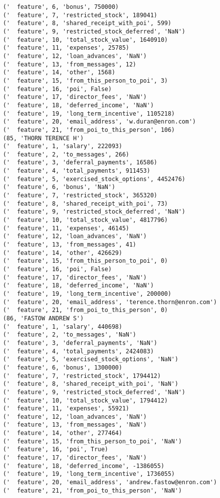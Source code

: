 \begin{verbatim}
('  feature', 6, 'bonus', 750000)
('  feature', 7, 'restricted_stock', 189041)
('  feature', 8, 'shared_receipt_with_poi', 599)
('  feature', 9, 'restricted_stock_deferred', 'NaN')
('  feature', 10, 'total_stock_value', 1640910)
('  feature', 11, 'expenses', 25785)
('  feature', 12, 'loan_advances', 'NaN')
('  feature', 13, 'from_messages', 12)
('  feature', 14, 'other', 1568)
('  feature', 15, 'from_this_person_to_poi', 3)
('  feature', 16, 'poi', False)
('  feature', 17, 'director_fees', 'NaN')
('  feature', 18, 'deferred_income', 'NaN')
('  feature', 19, 'long_term_incentive', 1105218)
('  feature', 20, 'email_address', 'w.duran@enron.com')
('  feature', 21, 'from_poi_to_this_person', 106)
(85, 'THORN TERENCE H')
('  feature', 1, 'salary', 222093)
('  feature', 2, 'to_messages', 266)
('  feature', 3, 'deferral_payments', 16586)
('  feature', 4, 'total_payments', 911453)
('  feature', 5, 'exercised_stock_options', 4452476)
('  feature', 6, 'bonus', 'NaN')
('  feature', 7, 'restricted_stock', 365320)
('  feature', 8, 'shared_receipt_with_poi', 73)
('  feature', 9, 'restricted_stock_deferred', 'NaN')
('  feature', 10, 'total_stock_value', 4817796)
('  feature', 11, 'expenses', 46145)
('  feature', 12, 'loan_advances', 'NaN')
('  feature', 13, 'from_messages', 41)
('  feature', 14, 'other', 426629)
('  feature', 15, 'from_this_person_to_poi', 0)
('  feature', 16, 'poi', False)
('  feature', 17, 'director_fees', 'NaN')
('  feature', 18, 'deferred_income', 'NaN')
('  feature', 19, 'long_term_incentive', 200000)
('  feature', 20, 'email_address', 'terence.thorn@enron.com')
('  feature', 21, 'from_poi_to_this_person', 0)
(86, 'FASTOW ANDREW S')
('  feature', 1, 'salary', 440698)
('  feature', 2, 'to_messages', 'NaN')
('  feature', 3, 'deferral_payments', 'NaN')
('  feature', 4, 'total_payments', 2424083)
('  feature', 5, 'exercised_stock_options', 'NaN')
('  feature', 6, 'bonus', 1300000)
('  feature', 7, 'restricted_stock', 1794412)
('  feature', 8, 'shared_receipt_with_poi', 'NaN')
('  feature', 9, 'restricted_stock_deferred', 'NaN')
('  feature', 10, 'total_stock_value', 1794412)
('  feature', 11, 'expenses', 55921)
('  feature', 12, 'loan_advances', 'NaN')
('  feature', 13, 'from_messages', 'NaN')
('  feature', 14, 'other', 277464)
('  feature', 15, 'from_this_person_to_poi', 'NaN')
('  feature', 16, 'poi', True)
('  feature', 17, 'director_fees', 'NaN')
('  feature', 18, 'deferred_income', -1386055)
('  feature', 19, 'long_term_incentive', 1736055)
('  feature', 20, 'email_address', 'andrew.fastow@enron.com')
('  feature', 21, 'from_poi_to_this_person', 'NaN')

\end{verbatim}
